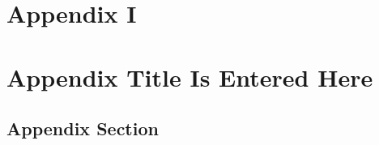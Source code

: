 \documentclass[12pt]{article}
\begin{document}
{}
{\clearpage}
\setcounter{equation}{0}%
\section{Appendix I}%
\section{Appendix Title Is Entered Here}
\subsection{Appendix Section}
\end{document}
